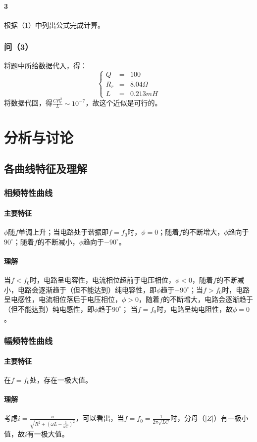 \documentclass{ctexart}
\begin{document}
\paragraph{3}根据（1）中列出公式完成计算。
\subsubsection{问（3）}
将题中所给数据代入，得：
$$ \left\{
  \begin{aligned}
  Q & = & 100 \\
  R_r & = & 8.04\Omega \\
  L & = & 0.213 mH
  \end{aligned}
  \right.
  $$
  将数据代回，得$\frac{CR_r^2}{L}\sim10^{-7}$，故这个近似是可行的。
  \section{分析与讨论}
  \subsection{各曲线特征及理解}
  \subsubsection{相频特性曲线}
  \paragraph{主要特征}$\phi$随$f$单调上升；当电路处于谐振即$f=f_0$时，$\phi=0$；随着$f$的不断增大，$\phi$趋向于$90^\circ$；随着$f$的不断减小，$\phi$趋向于$-90^\circ$。
  \paragraph{理解}当$f<f_0$时，电路呈电容性，电流相位超前于电压相位，$\phi<0$，随着$f$的不断减小，电路会逐渐趋于（但不能达到）纯电容性，即$\phi$趋于$-90^\circ$；当$f>f_0$时，电路呈电感性，电流相位落后于电压相位，$\phi>0$，随着$f$的不断增大，电路会逐渐趋于（但不能达到）纯电感性，即$\phi$趋于$90^\circ$；
当$f=f_0$时，电路呈纯电阻性，故$\phi=0$。
  \subsubsection{幅频特性曲线}
  \paragraph{主要特征}在$f=f_0$处，存在一极大值。
  \paragraph{理解}考虑$i = \frac {u}{\sqrt{R^2+(\omega L-\frac{1}{\omega C})^2}}$，可以看出，当$f=f_0=\frac{1}{2\pi\sqrt{LC}}$时，分母（$|Z|$）有一极小值，故$i$有一极大值。
\end{document}
